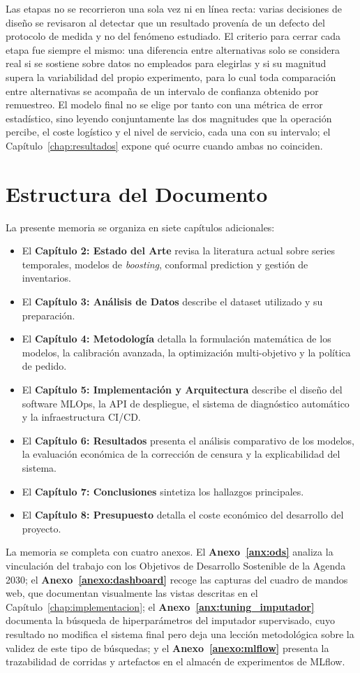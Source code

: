 Las etapas no se recorrieron una sola vez ni en línea recta: varias decisiones de diseño se
revisaron al detectar que un resultado provenía de un defecto del protocolo de medida y no del
fenómeno estudiado. El criterio para cerrar cada etapa fue siempre el mismo: una diferencia entre
alternativas solo se considera real si se sostiene sobre datos no empleados para elegirlas y si su
magnitud supera la variabilidad del propio experimento, para lo cual toda comparación entre
alternativas se acompaña de un intervalo de confianza obtenido por remuestreo. El modelo final no
se elige por tanto con una métrica de error estadístico, sino leyendo conjuntamente las dos
magnitudes que la operación percibe, el coste logístico y el nivel de servicio, cada una con su
intervalo; el Capítulo~\ref{chap:resultados} expone qué ocurre cuando ambas no coinciden.

\section{Estructura del Documento}
La presente memoria se organiza en siete capítulos adicionales:
\begin{itemize}
    \item El \textbf{Capítulo 2: Estado del Arte} revisa la literatura actual sobre series temporales, modelos de \textit{boosting}, conformal prediction y gestión de inventarios.
    \item El \textbf{Capítulo 3: Análisis de Datos} describe el dataset utilizado y su preparación.
    \item El \textbf{Capítulo 4: Metodología} detalla la formulación matemática de los modelos, la calibración avanzada, la optimización multi-objetivo y la política de pedido.
    \item El \textbf{Capítulo 5: Implementación y Arquitectura} describe el diseño del software MLOps, la API de despliegue, el sistema de diagnóstico automático y la infraestructura CI/CD.
    \item El \textbf{Capítulo 6: Resultados} presenta el análisis comparativo de los modelos, la evaluación económica de la corrección de censura y la explicabilidad del sistema.
    \item El \textbf{Capítulo 7: Conclusiones} sintetiza los hallazgos principales.
    \item El \textbf{Capítulo 8: Presupuesto} detalla el coste económico del desarrollo del proyecto.
\end{itemize}

La memoria se completa con cuatro anexos. El \textbf{Anexo~\ref{anx:ods}} analiza la
vinculación del trabajo con los Objetivos de Desarrollo Sostenible de la Agenda 2030; el
\textbf{Anexo~\ref{anexo:dashboard}} recoge las capturas del cuadro de mandos web, que
documentan visualmente las vistas descritas en el Capítulo~\ref{chap:implementacion}; el
\textbf{Anexo~\ref{anx:tuning_imputador}} documenta la búsqueda de hiperparámetros del
imputador supervisado, cuyo resultado no modifica el sistema final pero deja una lección
metodológica sobre la validez de este tipo de búsquedas; y el \textbf{Anexo~\ref{anexo:mlflow}}
presenta la trazabilidad de corridas y artefactos en el almacén de experimentos de MLflow.

